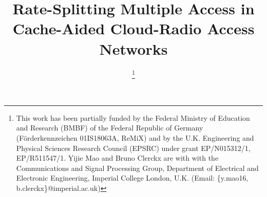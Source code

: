 \documentclass[12pt,draftcls,onecolumn]{IEEEtran}
\theoremstyle{remark}
\theoremstyle{definition}
\begin{document}
\title{Rate-Splitting Multiple Access in Cache-Aided Cloud-Radio Access Networks}
\author{	
\thanks{This work has been partially funded by the Federal Ministry of Education and Research (BMBF) of the Federal Republic of Germany (F\"orderkennzeichen 01IS18063A, ReMiX) and by the U.K. Engineering and Physical Sciences Research Council (EPSRC) under grant EP/N015312/1, EP/R511547/1. \newline
{}\newline
\indent Yijie Mao and Bruno Clerckx are with with the Communications and Signal Processing Group, Department of Electrical and Electronic Engineering, Imperial College London, U.K. (Email: \{y.mao16, b.clerckx\}@imperial.ac.uk)
}
}
\maketitle
\end{document}
